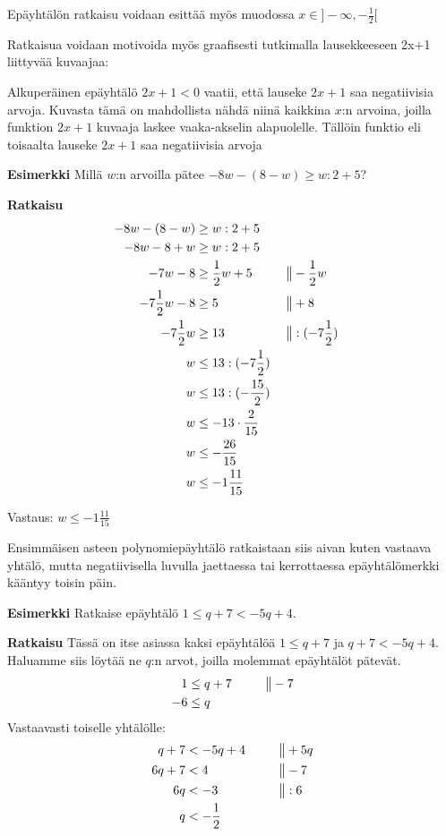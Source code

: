 Epäyhtälön ratkaisu voidaan esittää myös muodossa $x \in ]-\infty, -\frac{1}{2}[$

Ratkaisua voidaan motivoida myös graafisesti tutkimalla lausekkeeseen 2x+1 liittyvää kuvaajaa:


Alkuperäinen epäyhtälö $2x+1<0$ vaatii, että lauseke $2x+1$ saa negatiivisia arvoja. Kuvasta tämä on mahdollista nähdä niinä kaikkina $x$:n arvoina, joilla funktion $2x+1$ kuvaaja laskee vaaka-akselin alapuolelle. Tällöin funktio eli toisaalta lauseke $2x+1$ saa negatiivisia arvoja

\textbf{Esimerkki}
Millä $w$:n arvoilla pätee $-8w-(8-w)\geq w:2+5$?

\textbf{Ratkaisu}
\begin{align*}
-8w-(8-w)&\geq w:2+5 \\
-8w-8+w&\geq w:2+5 \\
-7w-8&\geq \frac12 w+5  \ \ \ \ \ &&\big\| -\frac12 w \\
-7\frac12 w-8&\geq 5  \ \ \ \ \ &&\big\| +8 \\
-7\frac12 w&\geq 13  \ \ \ \ \ &&\big\| :(-7\frac12) \\
w&\leq 13:(-7\frac12) \\
w&\leq 13:(-\frac{15}{2}) \\
w&\leq -13\cdot \frac{2}{15} \\
w&\leq -\frac{26}{15} \\
w&\leq -1\frac{11}{15}
\end{align*}

Vastaus: $w\leq -1\frac{11}{15}$

Ensimmäisen asteen polynomiepäyhtälö ratkaistaan siis aivan kuten vastaava yhtälö, mutta negatiivisella luvulla jaettaessa tai kerrottaessa epäyhtälömerkki kääntyy toisin päin.

\textbf{Esimerkki}
Ratkaise epäyhtälö $1\leq q+7<-5q+4$.

\textbf{Ratkaisu}
Tässä on itse asiassa kaksi epäyhtälöä $1\leq q+7$ ja $q+7<-5q+4$. Haluamme siis löytää ne $q$:n arvot, joilla molemmat epäyhtälöt pätevät.
\begin{align*}
1&\leq q+7 \ \ \ \ \ &&\big\| -7 \\
-6&\leq q
\end{align*}
Vastaavasti toiselle yhtälölle:
\begin{align*}
q+7&<-5q+4  \ \ \ \ \ &&\big\| +5q \\
6q+7&<4 &&\big\| -7 \\
6q&<-3 &&\big\| :6 \\
q&< -\frac12 \\
\end{align*}

